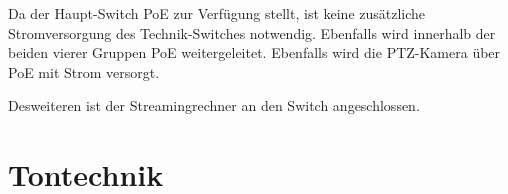 		Da der Haupt-Switch \Gls{PoE} zur Verfügung stellt, ist keine zusätzliche Stromversorgung des Technik-Switches notwendig. Ebenfalls wird innerhalb der beiden vierer Gruppen \Gls{PoE} weitergeleitet. Ebenfalls wird die \Gls{PTZ-Kamera} über \Gls{PoE} mit Strom versorgt.

		Desweiteren ist der Streamingrechner an den Switch angeschlossen.

	\section{Tontechnik}
		